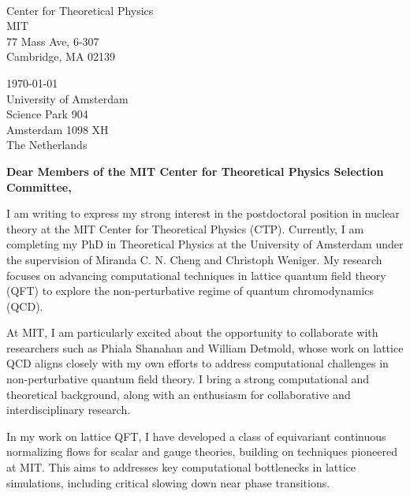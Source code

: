\documentclass[11pt]{article}
\title{}
\author{}
\date{}
\begin{document}
\thispagestyle{firstpagestyle}

\noindent
\begin{minipage}[t]{0.5\textwidth}
\phantom{
\today \\
}
\vspace{0.2cm} \\
Center for Theoretical Physics \\
MIT \\
77 Mass Ave, 6-307 \\
Cambridge, MA 02139

\end{minipage}
\begin{minipage}[t]{0.5\textwidth}
\flushright
\today \\
\vspace{0.2cm}
University of Amsterdam \\
Science Park 904 \\
Amsterdam 1098 XH \\
The Netherlands \\
\end{minipage}

\vspace{30pt}

\noindent
\textbf{Dear Members of the MIT Center for Theoretical Physics Selection Committee,}

\vspace{15pt}

I am writing to express my strong interest in the postdoctoral position in nuclear theory at the MIT Center for Theoretical Physics (CTP). Currently, I am completing my PhD in Theoretical Physics at the University of Amsterdam under the supervision of Miranda C. N. Cheng and Christoph Weniger. My research focuses on advancing computational techniques in lattice quantum field theory (QFT) to explore the non-perturbative regime of quantum chromodynamics (QCD).

At MIT, I am particularly excited about the opportunity to collaborate with researchers such as Phiala Shanahan and William Detmold, whose work on lattice QCD aligns closely with my own efforts to address computational challenges in non-perturbative quantum field theory. I bring a strong computational and theoretical background, along with an enthusiasm for collaborative and interdisciplinary research.

In my work on lattice QFT, I have developed a class of equivariant continuous normalizing flows for scalar and gauge theories, building on techniques pioneered at MIT. This aims to addresses key computational bottlenecks in lattice simulations, including critical slowing down near phase transitions.
\end{document}
